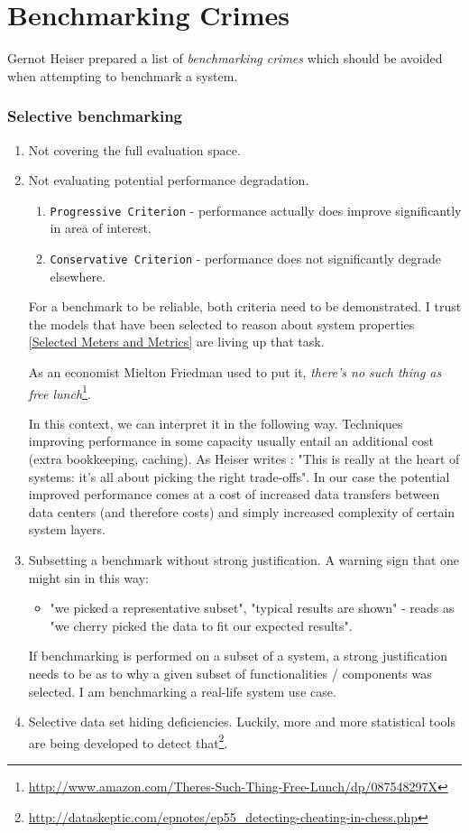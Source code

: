 \documentclass{uvamscse}
\begin{document}
\section{Benchmarking Crimes}

Gernot Heiser prepared a list \cite{GerHeiBench} of \textit{benchmarking crimes} which should be avoided when attempting to benchmark a system.

\subsubsection{Selective benchmarking}
\begin{enumerate}
  \item Not covering the full evaluation space.
  \item Not evaluating potential performance degradation.
    \begin{enumerate}
      \item \texttt{Progressive Criterion} - performance actually does improve significantly in area of interest.
      \item \texttt{Conservative Criterion} - performance does not significantly degrade elsewhere.
    \end{enumerate}
    For a benchmark to be reliable, both criteria need to be demonstrated. I trust the models that have been selected to reason about system properties \ref{Selected Meters and Metrics} are living up that task.

    As an economist Mielton Friedman used to put it, \textit{there's no such thing as free lunch}\footnote{\url{http://www.amazon.com/Theres-Such-Thing-Free-Lunch/dp/087548297X}}.

    In this context, we can interpret it in the following way. Techniques improving performance in some capacity usually entail an additional cost (extra bookkeeping, caching). As Heiser writes \cite{GerHeiBench}: "This is really at the heart of systems: it's all about picking the right trade-offs". In our case the potential improved performance comes at a cost of increased data transfers between data centers (and therefore costs) and simply increased complexity of certain system layers.
  \item Subsetting a benchmark without strong justification. A warning sign that one might sin in this way:
    \begin{itemize}
      \item "we picked a representative subset", "typical results are shown" - reads as "we cherry picked the data to fit our expected results".
    \end{itemize}
    If benchmarking is performed on a subset of a system, a strong justification needs to be as to why a given subset of functionalities / components was selected. I am benchmarking a real-life system use case.
  \item Selective data set hiding deficiencies. Luckily, more and more statistical tools are being developed to detect that\footnote{\url{http://dataskeptic.com/epnotes/ep55_detecting-cheating-in-chess.php}}.
\end{enumerate}
\end{document}
